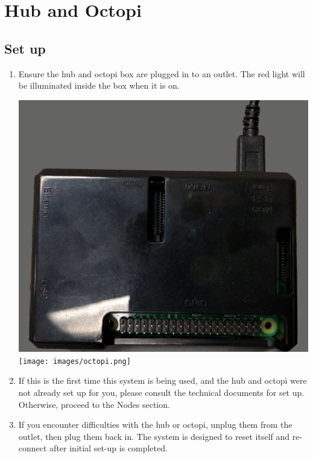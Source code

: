   \section{Hub and Octopi}
  \subsection{Set up}
    \begin{enumerate}
      \item Ensure the hub and octopi box are plugged in to an outlet.
      The red light will be illuminated inside the box when it is on.\\ 
      \begin{center}
      \includegraphics[scale=.1]{images/Hub.png}
      \texttt{[image: images/octopi.png]}
    \end{center}

      \item If this is the first time this system is being used, and the hub and octopi were not already set up for you, please consult
      the technical documents for set up.  Otherwise, proceed to the Nodes section.

      \item If you encounter difficulties with the hub or octopi, unplug them from the outlet, then
       plug them back in.  The system is designed to reset itself and re-connect
       after initial set-up is completed.
    \end{enumerate}
